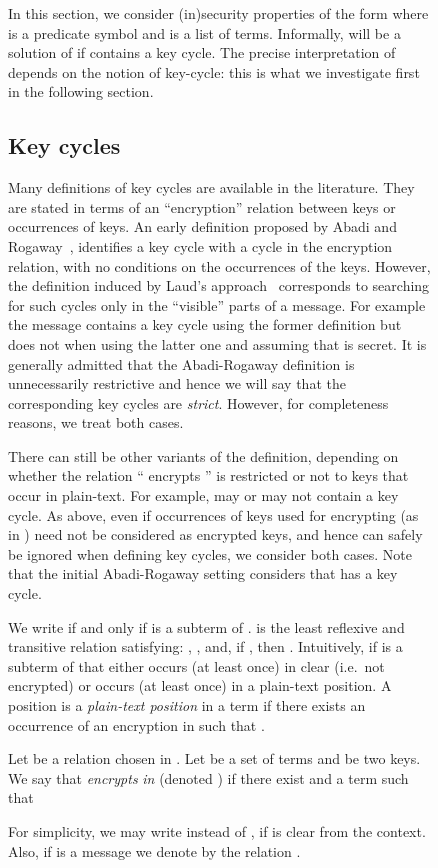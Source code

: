 \documentclass[acmtocl,acmnow]{acmtrans2m}
\begin{document}
\begin{figure}[t]
{{In this section, we consider (in)security properties of the form
 where  is a predicate symbol and  is a list of terms. Informally,
 will be a solution of  if  contains a key cycle.
The precise interpretation of  depends on the notion of key-cycle:
this is what we investigate first in the following section.





\subsection{Key cycles}
Many definitions of key cycles are available in the literature. They
are stated in terms of an ``encryption'' relation between keys or
occurrences of keys.  An early definition proposed by Abadi and Rogaway~\cite{ARCryptology02},
identifies a key cycle with a cycle in the encryption relation, with
no conditions on the occurrences of the keys.
However, the definition induced by Laud's
approach~\cite{Laud-NORDSEC02} corresponds to searching for such
cycles only in the ``visible'' parts of a message. For example the
message  contains a key cycle using the former
definition but does not when using the latter one and assuming that
 is secret. It is generally admitted that the Abadi-Rogaway
definition is unnecessarily restrictive and hence we will say that the
corresponding key cycles are \emph{strict}. However, for completeness
reasons, we treat both cases.






There can still be other variants of the definition,
depending on whether  the relation `` encrypts '' is restricted or not to keys  that occur in
plain-text. For example,  may or may not contain a key cycle. As above, even if
occurrences of keys used for encrypting (as  in ) need not be considered as encrypted keys,
and hence can safely be ignored when defining key cycles, we consider both cases. Note that the
initial Abadi-Rogaway setting considers that  has a key cycle.


We write  if and only if  is a subterm of .
 is the least reflexive and transitive relation
satisfying: , , and, if ,
 then .
Intuitively,  if  is a subterm of  that either
occurs (at least once) in clear (i.e.~not encrypted) or occurs (at
least once) in a plain-text position.  A position  is a
\emph{plain-text position} in a term  if there exists an occurrence
 of an encryption in  such that .

\begin{definition}
Let  be a relation chosen in
. Let  be a set of terms and  be two keys. We say that
 \emph{encrypts}  \emph{in}  (denoted ) if there exist
 and a term  such that 
\end{definition}
For simplicity, we may write  instead of , if  is
clear from the context.  Also, if  is a message we denote by
 the relation .





}}
\end{figure}
\end{document}
